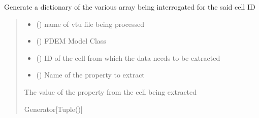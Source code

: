 \documentclass[letterpaper,10pt,english]{sphinxmanual}
\begin{document}
\begin{fulllineitems}
\label{\detokenize{openfdem:openfdem.extract_cell_thread_pool_generators.history_cellinfo_func}}
\pysigstartsignatures
{}
\pysigstopsignatures
\sphinxAtStartPar
Generate a dictionary of the various array being interrogated for the said cell ID
\begin{quote}\begin{description}
\begin{itemize}
\item {} 
\sphinxAtStartPar
{} () \textendash{} name of vtu file being processed

\item {} 
\sphinxAtStartPar
{} ({\hyperref[\detokenize{openfdem:openfdem.openfdem.Model}]{}}) \textendash{} FDEM Model Class

\item {} 
\sphinxAtStartPar
{} () \textendash{} ID of the cell from which the data needs to be extracted

\item {} 
\sphinxAtStartPar
{} (\sphinxstyleliteralemphasis{\sphinxupquote{{[}}}\sphinxstyleliteralemphasis{\sphinxupquote{{]}}}) \textendash{} Name of the property to extract

\end{itemize}

\sphinxAtStartPar
The value of the property from the cell being extracted

\sphinxAtStartPar
Generator{[}Tuple(){]}

\end{description}\end{quote}

\end{fulllineitems}
\end{document}
